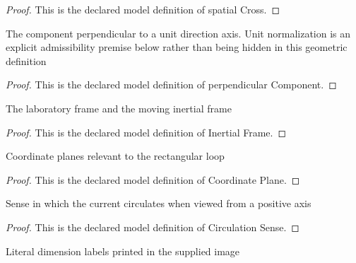 \begin{proof}
  This is the declared model definition of spatial Cross.
\end{proof}
\begin{definition}
  \label{def:physics:phyx-mini-0609:phyxminiproblems-problemphyxmini0609-perpendicularcomponent}
  The component perpendicular to a unit direction axis. Unit normalization is an explicit admissibility premise below rather than being hidden in this geometric definition
\end{definition}
\begin{proof}
  This is the declared model definition of perpendicular Component.
\end{proof}
\begin{definition}
  \label{def:physics:phyx-mini-0609:phyxminiproblems-problemphyxmini0609-inertialframe}
  The laboratory frame and the moving inertial frame
\end{definition}
\begin{proof}
  This is the declared model definition of Inertial Frame.
\end{proof}
\begin{definition}
  \label{def:physics:phyx-mini-0609:phyxminiproblems-problemphyxmini0609-coordinateplane}
  Coordinate planes relevant to the rectangular loop
\end{definition}
\begin{proof}
  This is the declared model definition of Coordinate Plane.
\end{proof}
\begin{definition}
  \label{def:physics:phyx-mini-0609:phyxminiproblems-problemphyxmini0609-circulationsense}
  Sense in which the current circulates when viewed from a positive axis
\end{definition}
\begin{proof}
  This is the declared model definition of Circulation Sense.
\end{proof}
\begin{definition}
  \label{def:physics:phyx-mini-0609:phyxminiproblems-problemphyxmini0609-dimensionlabel}
  Literal dimension labels printed in the supplied image
\end{definition}
